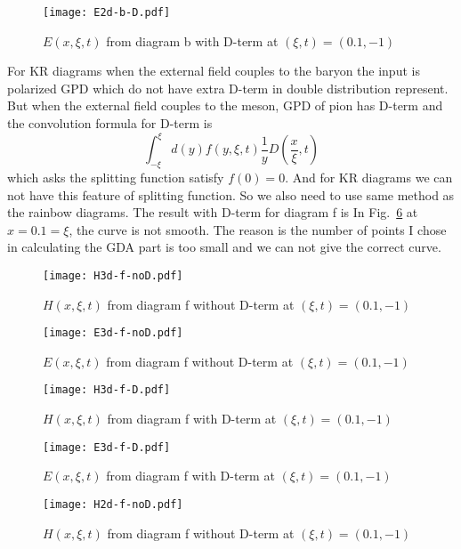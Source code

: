 \documentclass[preprintnumbers,prd,superscriptaddress,preprint]{revtex4-1}
\begin{document}
	\begin{figure}[h]
		\begin{center}
			\texttt{[image: E2d-b-D.pdf]}
			\caption{$E(x,\xi,t)$ from diagram b with D-term at $(\xi,t)=(0.1,-1)$} 
			\label{E-b-D}
		\end{center}
	\end{figure}
	For KR diagrams when the external field couples to the baryon the input is polarized GPD which do not have extra D-term in double distribution represent. But when the external field couples to the meson, GPD of pion has D-term and the convolution formula for D-term is 
	\[
	\int_{-\xi}^{\xi}d(y)f(y,\xi,t)\frac{1}{y}D(\frac{x}{\xi},t)
	\]
	which asks the splitting function satisfy $f(0)=0$. And for KR diagrams we can not have this feature of splitting function. So we also need to use same method as the rainbow diagrams. The result with D-term for diagram f is
	In Fig.~\ref{H-f-nD} at $x=0.1=\xi$, the curve is not smooth. The reason is the number of  points I chose in calculating the GDA part is too small and we can not give the correct curve. 
	\begin{figure}[h]
		\begin{center}
			\texttt{[image: H3d-f-noD.pdf]}
			\caption{$H(x,\xi,t)$ from diagram f without D-term at $(\xi,t)=(0.1,-1)$} 
			\label{H-f-nD-3d}
		\end{center}
	\end{figure}
	\begin{figure}[h]
		\begin{center}
			\texttt{[image: E3d-f-noD.pdf]}
			\caption{$E(x,\xi,t)$ from diagram f without D-term at $(\xi,t)=(0.1,-1)$} 
			\label{E-f-nD-3d}
		\end{center}
	\end{figure}
	\begin{figure}[h]
		\begin{center}
			\texttt{[image: H3d-f-D.pdf]}
			\caption{$H(x,\xi,t)$ from diagram f with D-term at $(\xi,t)=(0.1,-1)$} 
			\label{H-f-D-3d}
		\end{center}
	\end{figure}
	\begin{figure}[h]
		\begin{center}
			\texttt{[image: E3d-f-D.pdf]}
			\caption{$E(x,\xi,t)$ from diagram f with D-term at $(\xi,t)=(0.1,-1)$} 
			\label{E-f-D-3d}
		\end{center}
	\end{figure}
	\begin{figure}[h]
		\begin{center}
			\texttt{[image: H2d-f-noD.pdf]}
			\caption{$H(x,\xi,t)$ from diagram f without D-term at $(\xi,t)=(0.1,-1)$} 
			\label{H-f-nD}
		\end{center}
	\end{figure}
\end{document}
